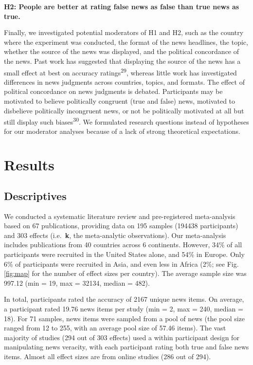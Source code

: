 \documentclass[
  man]{apa6}
\begin{document}
\textbf{H2: People are better at rating false news as false than true news as true.}

Finally, we investigated potential moderators of H1 and H2, such as the country where the experiment was conducted, the format of the news headlines, the topic, whether the source of the news was displayed, and the political concordance of the news. Past work has suggested that displaying the source of the news has a small effect at best on accuracy ratings\textsuperscript{29}, whereas little work has investigated differences in news judgments across countries, topics, and formats. The effect of political concordance on news judgments is debated. Participants may be motivated to believe politically congruent (true and false) news, motivated to disbelieve politically incongruent news, or not be politically motivated at all but still display such biases\textsuperscript{30}. We formulated research questions instead of hypotheses for our moderator analyses because of a lack of strong theoretical expectations.

\section{Results}\label{results}

\subsection{Descriptives}\label{descriptives}

We conducted a systematic literature review and pre-registered meta-analysis based on 67 publications, providing data on 195 samples (194438 participants) and 303 effects (i.e.~\textbf{k}, the meta-analytic observations). Our meta-analysis includes publications from 40 countries across 6 continents. However, 34\% of all participants were recruited in the United States alone, and 54\% in Europe. Only 6\% of participants were recruited in Asia, and even less in Africa (2\%; see Fig. \ref{fig:map} for the number of effect sizes per country). The average sample size was 997.12 (min = 19, max = 32134, median = 482).

In total, participants rated the accuracy of 2167 unique news items. On average, a participant rated 19.76 news items per study (min = 2, max = 240, median = 18). For 71 samples, news items were sampled from a pool of news (the pool size ranged from 12 to 255, with an average pool size of 57.46 items). The vast majority of studies (294 out of 303 effects) used a within participant design for manipulating news veracity, with each participant rating both true and false news items. Almost all effect sizes are from online studies (286 out of 294).
\end{document}
